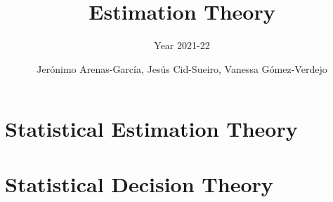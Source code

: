 \documentclass[graybox,envcountchap,sectrefs]{svmono_mod}
\begin{document}
\author{Jer\'onimo Arenas-Garc\'ia, Jes\'us Cid-Sueiro, Vanessa G\'omez-Verdejo}
\title{Estimation Theory}
\subtitle{Year 2021-22}

\frontmatter

\mainmatter %

\chapter{Statistical Estimation Theory}

\localtableofcontents
\newpage








\chapter{Statistical Decision Theory}
\label{ch:SDT}

\localtableofcontents

%

\backmatter
\printindex
\end{document}
